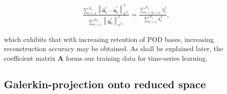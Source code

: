 \documentclass[preprint,12pt]{elsarticle}
\begin{document}
\begin{linenomath*}
\begin{align}
\frac{\sum_{i=1}^{N_{s}}\left\|\hat{\mathbf{u}}^i_h-\tilde{\mathbf{u}}^i_h \right\|_{\mathbb{R}^{N_{h}}}^{2}}{\sum_{i=1}^{N_{s}}\left\|\hat{\mathbf{u}}^i_h\right\|_{\mathbb{R}^{N_{h}}}^{2}}=\frac{\sum_{i=N_r+1}^{N_{s}} \lambda_{i}^{2}}{\sum_{i=1}^{N_{s}} \lambda_{i}^{2}},
\end{align}
\end{linenomath*}
which exhibits that with increasing retention of POD bases, increasing reconstruction accuracy may be obtained. As shall be explained later, the coefficient matrix $\mathbf{A}$ forms our training data for time-series learning.

\subsection{Galerkin-projection onto reduced space}
\end{document}
